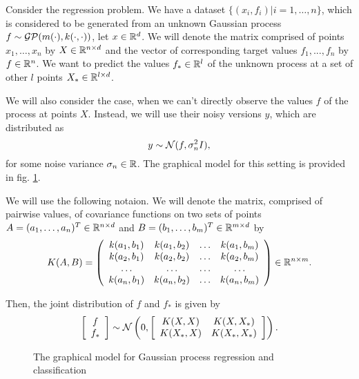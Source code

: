 \label{gp_regression}
Consider the regression problem. We have a dataset $\{(x_i, f_i) | i = 1, \ldots, n\}$, which is considered to be generated from an unknown Gaussian process $f \sim \mathcal{GP}(m(\cdot), k(\cdot, \cdot))$, let $x \in \mathbb{R}^d$.  We will denote the matrix comprised of points $x_1, \ldots, x_n$ by $X \in \mathbb{R}^{n \times d}$ and the vector of corresponding target values $f_1, ..., f_n$ by $f \in \mathbb{R}^n$. We want to predict the values $f_* \in \mathbb{R}^l$ of the unknown process at a set of other $l$ points $X_* \in \mathbb{R}^{l \times d}$.

We will also consider the case, when we can't directly observe the values $f$ of the process at points $X$. Instead, we will use their noisy versions $y$, which are distributed as
$$y \sim \mathcal{N}(f, \sigma_n^2 I),$$
for some noise variance $\sigma_n \in \mathbb{R}$. The graphical model for this setting is provided in fig. \ref{gp_graphical_model}.

We will use the following notaion. We will denote the matrix, comprised of pairwise values, of covariance functions on two sets of points $A = (a_1, \ldots, a_n)^T \in \mathbb{R}^{n \times d}$ and $B = (b_1, \ldots, b_m)^T \in \mathbb{R}^{m \times d}$ by
$$K(A, B) = 
\left (\begin{array}{cccc} 
	k(a_1, b_1) & k(a_1, b_2) & \ldots & k(a_1, b_m) \\
	k(a_2, b_1) & k(a_2, b_2) & \ldots & k(a_2, b_m) \\
	\ldots & \ldots & \ldots & \ldots \\
	k(a_n, b_1) & k(a_n, b_2) & \ldots & k(a_n, b_m) \\
\end{array} \right) \in \mathbb{R}^{n \times m}.
$$

Then, the joint distribution of $f$ and $f_*$ is given by
$$
\left [ \begin{array}{c} f\\ f_* \end{array} \right ]
\sim
\mathcal{N} \left ( 0, \left [\begin{array}{cc} K(X, X) & K(X, X_*)\\ K(X_*, X) & K(X_*, X_*) \end{array} \right] \right ).
$$

\begin{figure}[!h]
	\centering
	\scalebox{0.9}{
		
	}
	\caption{The graphical model for Gaussian process regression and classification}
	\label{gp_graphical_model}
\end{figure}

